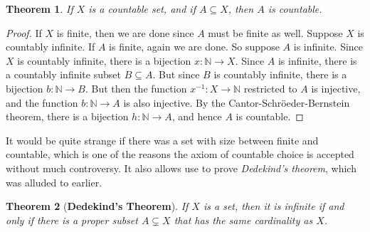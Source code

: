 \documentclass{article}
\theoremstyle{plain}
\newtheorem{theorem}{Theorem}[section]
\theoremstyle{normal}
\begin{document}
        \begin{theorem}
            If $X$ is a countable set, and if $A\subseteq{X}$, then $A$ is
            countable.
        \end{theorem}
        \begin{proof}
            If $X$ is finite, then we are done since $A$ must be finite as well.
            Suppose $X$ is countably infinite. If $A$ is finite, again we are
            done. So suppose $A$ is infinite. Since $X$ is countably infinite,
            there is a bijection $x:\mathbb{N}\rightarrow{X}$. Since $A$ is
            infinite, there is a countably infinite subset $B\subseteq{A}$.
            But since $B$ is countably infinite, there is a bijection
            $b:\mathbb{N}\rightarrow{B}$. But then the function
            $x^{-1}:X\rightarrow\mathbb{N}$ restricted to $A$ is injective,
            and the function $b:\mathbb{N}\rightarrow{A}$ is also injective.
            By the Cantor-Schr\"{o}eder-Bernstein theorem, there is a bijection
            $h:\mathbb{N}\rightarrow{A}$, and hence $A$ is countable.
        \end{proof}
        It would be quite strange if there was a set with size between
        finite and countable, which is one of the reasons the axiom of
        countable choice is accepted without much controversy. It also allows
        use to prove \textit{Dedekind's theorem}, which was alluded to earlier.
        \begin{theorem}[\textbf{Dedekind's Theorem}]
            If $X$ is a set, then it is infinite if and only if there is a
            proper subset $A\subsetneq{X}$ that has the same cardinality as
            $X$.
        \end{theorem}
\end{document}
